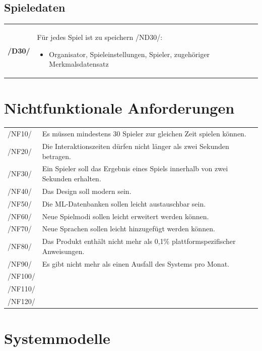 \documentclass[a4paper]{scrreprt}
\begin{document}
    \section{Spieledaten}
    \begin{tabularx}{\linewidth}{@{}>{\bfseries}l@{\hspace{.5em}}X@{}}
        /D30/ & Für jedes \Gls{Spiel} ist zu speichern /ND30/: 
        \begin{itemize}
             \item \Gls{Organisator}, \Gls{Spieleinstellungen}, \Gls{Spieler}, zugehöriger Merkmalsdatensatz %
        \end{itemize}
    \end{tabularx}


    \chapter{Nichtfunktionale Anforderungen}

    \begin{tabular}{ l | l}
        /NF10/ & Es müssen mindestens 30 Spieler zur gleichen Zeit spielen können.\\
        /NF20/ & Die Interaktionszeiten dürfen nicht länger als zwei Sekunden betragen. \\
        /NF30/ & Ein Spieler soll das Ergebnis eines Spiels innerhalb von zwei Sekunden erhalten. \\
        /NF40/ & Das Design soll modern sein. \\
        /NF50/ & Die ML-Datenbanken sollen leicht austauschbar sein. \\
        /NF60/ & Neue Spielmodi sollen leicht erweitert werden können. \\
        /NF70/ & Neue Sprachen sollen leicht hinzugefügt werden können. \\
        /NF80/ & Das Produkt enthält nicht mehr als 0,1\% plattformspezifischer Anweisungen. \\
        /NF90/ & Es gibt nicht mehr als einen Ausfall des Systems pro Monat. \\ %
        /NF100/ & \\
        /NF110/ & \\
        /NF120/ & \\
    \end{tabular}

    \chapter{Systemmodelle}
\end{document}
